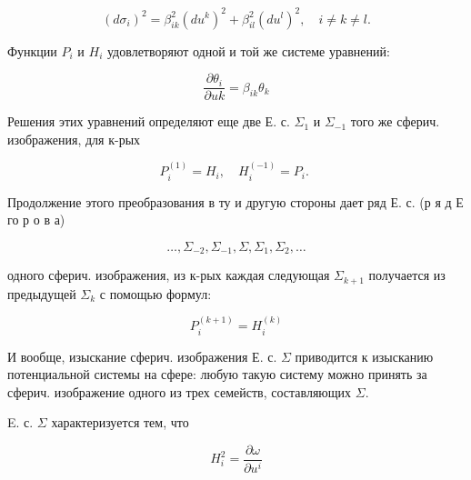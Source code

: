 \documentclass[10pt]{article}
\begin{document}
\[

\left(d \sigma_{i}\right)^{2}=\beta_{i k}^{2}\left(d u^{k}\right)^{2}+\beta_{i l}^{2}\left(d u^{l}\right)^{2}, \quad i \neq k \neq l .

\]



Функции $P_{i}$ и $H_{i}$ удовлетворяют одной и той же системе уравнений:



\[

\frac{\partial \theta_{i}}{\partial u k}=\beta_{i k} \theta_{k}

\]



Решения этих уравнений определяют еще две Е. с. $\Sigma_{1}$ и $\Sigma_{-1}$ того же сферич. изображения, для к-рых



\[

P_{i}^{(1)}=H_{i}, \quad H_{i}^{(-1)}=P_{i} \text {. }

\]



Продолжение этого преобразования в ту и другую стороны дает ряд Е. с. (р я д Е го р о в а)



\[

\ldots, \Sigma_{-2}, \Sigma_{-1}, \Sigma, \Sigma_{1}, \Sigma_{2}, \ldots

\]



одного сферич. изображения, из к-рых каждая следующая $\Sigma_{k+1}$ получается из предыдущей $\Sigma_{k}$ с помощью формул:



\[

P_{i}^{(k+1)}=H_{i}^{(k)}

\]



И вообще, изыскание сферич. изображения Е. с. $\Sigma$ приводится к изысканию потенциальной системы на сфере: любую такую систему можно принять за сферич. изображение одного из трех семейств, составляющих $\Sigma$.



E. с. $\Sigma$ характеризуется тем, что



\[

H_{i}^{2}=\frac{\partial \omega}{\partial u^{i}}

\]
\end{document}
